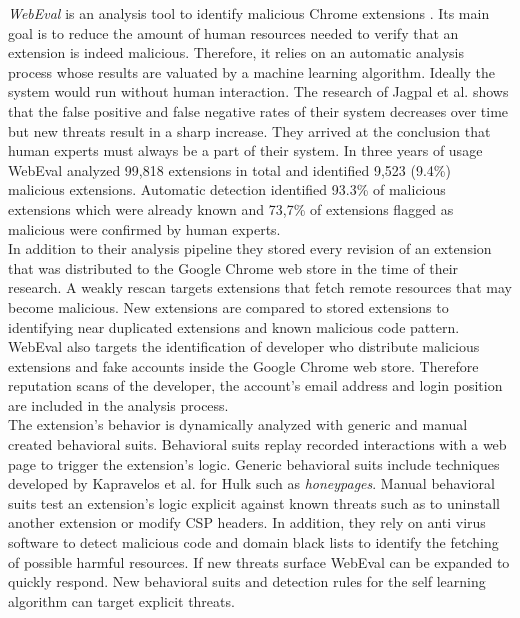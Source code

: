 	\textit{WebEval} is an analysis tool to identify malicious Chrome extensions \cite{190984}. Its main goal is to reduce the amount of human resources needed to verify that an extension is indeed malicious. Therefore, it relies on an automatic analysis process whose results are valuated by a machine learning algorithm. Ideally the system would run without human interaction. The research of Jagpal et al. shows that the false positive and false negative rates of their system decreases over time but new threats result in a sharp increase. They arrived at the conclusion that human experts must always be a part of their system. In three years of usage WebEval analyzed 99,818 extensions in total and identified 9,523 (9.4\%) malicious extensions. Automatic detection identified 93.3\% of malicious extensions which were already known and 73,7\% of extensions flagged as malicious were confirmed by human experts. \\
	In addition to their analysis pipeline they stored every revision of an extension that was distributed to the Google Chrome web store in the time of their research. A weakly rescan targets extensions that fetch remote resources that may become malicious. New extensions are compared to stored extensions to identifying near duplicated extensions and known malicious code pattern. WebEval also targets the identification of developer who distribute malicious extensions and fake accounts inside the Google Chrome web store. Therefore reputation scans of the developer, the account's email address and login position are included in the analysis process.  \\
	The extension's behavior is dynamically analyzed with generic and manual created behavioral suits. Behavioral suits replay recorded interactions with a web page to trigger the extension's logic. Generic behavioral suits include techniques developed by Kapravelos	et al. for Hulk \cite{184485} such as \textit{honeypages}. Manual behavioral suits test an extension's logic explicit against known threats such as to uninstall another extension or modify CSP headers. In addition, they rely on anti virus software to detect malicious code and domain black lists to identify the fetching of possible harmful resources. If new threats surface WebEval can be expanded to quickly respond. New behavioral suits and detection rules for the self learning algorithm can target explicit threats. 
	
